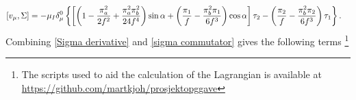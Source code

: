\begin{align}
    \left[v_\mu, \Sigma \right] 
    & =
    -\mu_I \delta^0_\mu
    \left\{
        \left[
        \left(
            1 
            - \frac{\pi_a^2}{2f^2}
            + \frac{\pi_a^2\pi_b^2}{24f^4}
        \right)
        \sin{\alpha}
        + 
        \left(
            \frac{\pi_1}{f} 
            - \frac{\pi_b^2\pi_1}{6f^3} 
        \right) \cos{\alpha}
        \right]
         \tau_2
        -
        \left(
            \frac{\pi_2}{f} 
            - \frac{\pi_b^2\pi_2}{6f^3} 
        \right)
        \tau_1
    \right\}.
    \label{sigma commutator}
\end{align}
Combining \autoref{Sigma derivative} and \autoref{sigma commutator} gives the following terms \footnote{The scripts used to aid the calculation of the Lagrangian is available at \url{https://github.com/martkjoh/prosjektopggave}}
